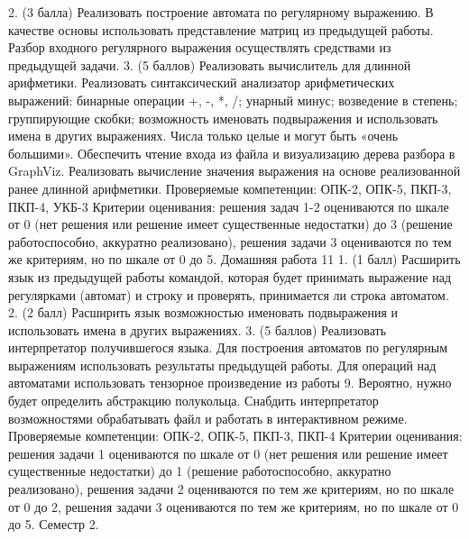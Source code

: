     2. (3 балла) Реализовать построение автомата по регулярному выражению. В качестве основы использовать представление матриц из предыдущей работы. Разбор входного регулярного выражения осуществлять средствами из предыдущей задачи.
    3. (5 баллов) Реализовать вычислитель для длинной арифметики. Реализовать синтаксический анализатор арифметических выражений: бинарные операции +, -, *, /; унарный минус; возведение в степень; группирующие скобки; возможность именовать подвыражения и использовать имена в других выражениях. Числа только целые и могут быть «очень большими». Обеспечить чтение входа из файла и визуализацию дерева разбора в GraphViz. Реализовать вычисление значения выражения на основе реализованной ранее длинной арифметики.
Проверяемые компетенции: ОПК-2, ОПК-5, ПКП-3, ПКП-4, УКБ-3
Критерии оценивания: решения задач 1-2 оцениваются по шкале от 0 (нет решения или решение имеет существенные недостатки) до 3 (решение работоспособно, аккуратно реализовано), решения задачи 3 оцениваются по тем же критериям, но по шкале от 0 до 5.
Домашняя работа 11 
    1. (1 балл) Расширить язык из предыдущей работы командой, которая будет принимать выражение над регулярками (автомат) и строку и проверять, принимается ли строка автоматом.
    2. (2 балл) Расширить язык возможностью именовать подвыражения и использовать имена в других выражениях. 
    3. (5 баллов) Реализовать интерпретатор получившегося языка. Для построения автоматов по регулярным выражениям использовать результаты предыдущей работы. Для операций над автоматами использовать тензорное произведение из работы 9. Вероятно, нужно будет определить абстракцию полукольца. Снабдить интерпретатор возможностями обрабатывать файл и работать в интерактивном режиме.   
Проверяемые компетенции: ОПК-2, ОПК-5, ПКП-3, ПКП-4
Критерии оценивания: решения задачи 1 оцениваются по шкале от 0 (нет решения или решение имеет существенные недостатки) до 1 (решение работоспособно, аккуратно реализовано), решения задачи 2 оцениваются по тем же критериям, но по шкале от 0 до 2, решения задачи 3 оцениваются по тем же критериям, но по шкале от 0 до 5.
Семестр 2.

